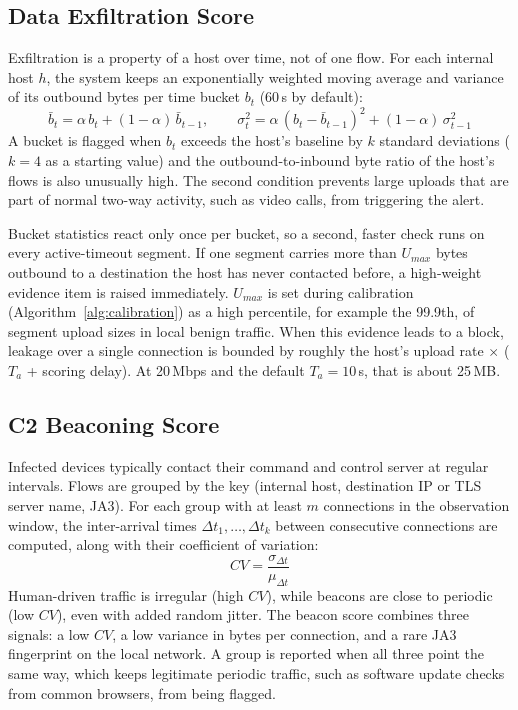 \subsection{Data Exfiltration Score}\label{sec:5.5.3}
\label{sec:exfil}
\noindent Exfiltration is a property of a host over time, not of one flow. For each internal host $h$, the system keeps an exponentially weighted moving average and variance of its outbound bytes per time bucket $b_t$ (60\,s by default):
\begin{equation}
\label{eq:ewma}
\bar{b}_t = \alpha\, b_t + (1 - \alpha)\, \bar{b}_{t-1}, \qquad
\sigma_t^2 = \alpha\, (b_t - \bar{b}_{t-1})^2 + (1 - \alpha)\, \sigma_{t-1}^2
\end{equation}
\noindent A bucket is flagged when $b_t$ exceeds the host's baseline by $k$ standard deviations ($k = 4$ as a starting value) and the outbound-to-inbound byte ratio of the host's flows is also unusually high. The second condition prevents large uploads that are part of normal two-way activity, such as video calls, from triggering the alert.

\noindent Bucket statistics react only once per bucket, so a second, faster check runs on every active-timeout segment. If one segment carries more than $U_{max}$ bytes outbound to a destination the host has never contacted before, a high-weight evidence item is raised immediately. $U_{max}$ is set during calibration (Algorithm~\ref{alg:calibration}) as a high percentile, for example the 99.9th, of segment upload sizes in local benign traffic. When this evidence leads to a block, leakage over a single connection is bounded by roughly the host's upload rate $\times$ ($T_a$ + scoring delay). At 20\,Mbps and the default $T_a = 10$\,s, that is about 25\,MB.

\subsection{C2 Beaconing Score}\label{sec:5.5.4}
\label{sec:beacon}
\noindent Infected devices typically contact their command and control server at regular intervals. Flows are grouped by the key (internal host, destination IP or TLS server name, JA3). For each group with at least $m$ connections in the observation window, the inter-arrival times $\Delta t_1, \ldots, \Delta t_k$ between consecutive connections are computed, along with their coefficient of variation:
\begin{equation}
\label{eq:cv}
CV = \frac{\sigma_{\Delta t}}{\mu_{\Delta t}}
\end{equation}
\noindent Human-driven traffic is irregular (high $CV$), while beacons are close to periodic (low $CV$), even with added random jitter. The beacon score combines three signals: a low $CV$, a low variance in bytes per connection, and a rare JA3 fingerprint on the local network. A group is reported when all three point the same way, which keeps legitimate periodic traffic, such as software update checks from common browsers, from being flagged.

